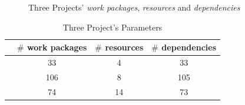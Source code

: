 \begin{figure}[!ht]
  \centering
  \caption{Three Projects' \emph{work packages}, \emph{resources} and \emph{dependencies}}
  \label{fig:dag}
\end{figure}


% 
\begin{table}[!h]
  \centering
  \caption{Three Project's Parameters}
  \label{tab:statis}
  \begin{tabular}{lccc}
    \hline
      & $\#$ work packages & $\#$ resources & $\#$ dependencies \\
    \hline
    \projectA{} & 33  & 4  & 33  \\
    \projectB{} & 106 & 8  & 105 \\
    \projectC{} & 74  & 14 & 73  \\
    \hline
  \end{tabular}
\end{table}


